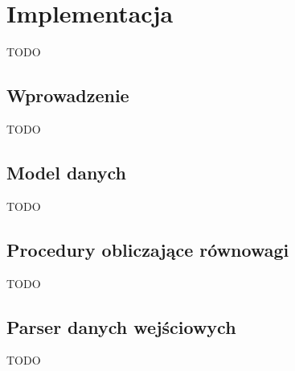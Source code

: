 \documentclass[00_main.tex]{subfiles}
\begin{document}
\pagestyle{headings}

\chapter{Implementacja}

TODO

\section{Wprowadzenie}

TODO

\section{Model danych}

TODO

\section{Procedury obliczające równowagi}

TODO

\section{Parser danych wejściowych}

TODO
\end{document}
